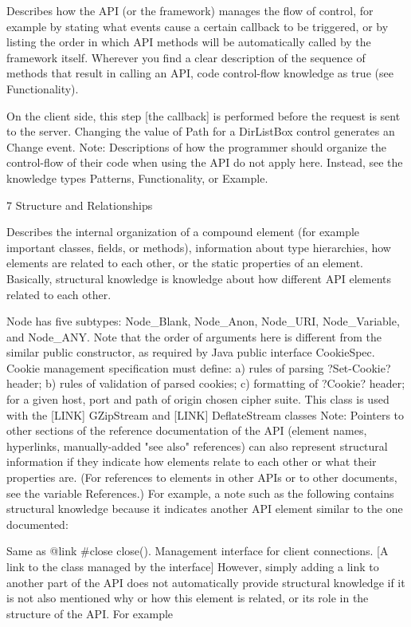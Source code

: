 Describes how the API (or the framework) manages the flow of control, for example by stating what events cause a certain callback to be triggered, or by listing the order in which API methods will be automatically called by the framework itself. Wherever you find a clear description of the sequence of methods that result in calling an API, code control-flow knowledge as true (see Functionality).

On the client side, this step [the callback] is performed before the request is sent to the server.
Changing the value of Path for a DirListBox control generates an Change event.
Note: Descriptions of how the programmer should organize the control-flow of their code when using the API do not apply here. Instead, see the knowledge types Patterns, Functionality, or Example.

7 Structure and Relationships

Describes the internal organization of a compound element (for example important classes, fields, or methods), information about type hierarchies, how elements are related to each other, or the static properties of an element. Basically, structural knowledge is knowledge about how different API elements related to each other.

Node has five subtypes: Node_Blank, Node_Anon, Node_URI, Node_Variable, and Node_ANY.
Note that the order of arguments here is different from the similar public constructor, as required by Java
public interface CookieSpec. Cookie management specification must define: a) rules of parsing ?Set-Cookie? header; b) rules of validation of parsed cookies; c) formatting of ?Cookie? header; for a given host, port and path of origin chosen cipher suite.
This class is used with the [LINK] GZipStream and [LINK] DeflateStream classes
Note: Pointers to other sections of the reference documentation of the API (element names, hyperlinks, manually-added "see also" references) can also represent structural information if they indicate how elements relate to each other or what their properties are. (For references to elements in other APIs or to other documents, see the variable References.) For example, a note such as the following contains structural knowledge because it indicates another API element similar to the one documented:

Same as {@link #close close()}.
Management interface for client connections. [A link to the class managed by the interface]
However, simply adding a link to another part of the API does not automatically provide structural knowledge if it is not also mentioned why or how this element is related, or its role in the structure of the API. For example

